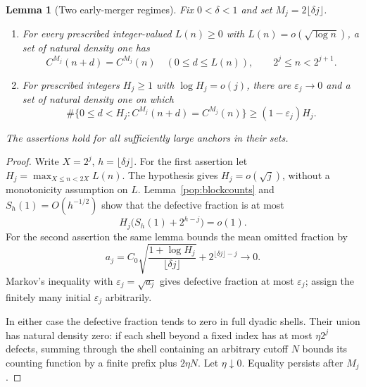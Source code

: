 \documentclass[11pt]{amsart}
\newtheorem{lemma}[theorem]{Lemma}
\theoremstyle{definition}
\theoremstyle{remark}
\begin{document}
\begin{lemma}[Two early-merger regimes]\label{lem:early}
Fix $0<\delta<1$ and set $M_j=2\lfloor\delta j\rfloor$.
\begin{enumerate}
\item For every prescribed integer-valued $L(n)\ge0$ with
$L(n)=o(\sqrt{\log n})$, a set of natural density one has
\[
 C^{M_j}(n+d)=C^{M_j}(n)\quad(0\le d\le L(n)),
 \qquad 2^j\le n<2^{j+1}.
\]
\item For prescribed integers $H_j\ge1$ with $\log H_j=o(j)$, there
are $\varepsilon_j\to0$ and a set of natural density one on which
\[
 \#\{0\le d<H_j:C^{M_j}(n+d)=C^{M_j}(n)\}
 \ge(1-\varepsilon_j)H_j.
\]
\end{enumerate}
The assertions hold for all sufficiently large anchors in their sets.
\end{lemma}
\begin{proof}
Write $X=2^j$, $h=\lfloor\delta j\rfloor$. For the first assertion let
$H_j=\max_{X\le n<2X}L(n)$. The hypothesis gives $H_j=o(\sqrt j)$,
without a monotonicity assumption on $L$. Lemma~\ref{pop:blockcounts}
and $S_h(1)=O(h^{-1/2})$ show that the defective fraction is at most
\[
 H_j\bigl(S_h(1)+2^{h-j}\bigr)=o(1).
\]
For the second assertion the same lemma bounds the mean omitted fraction by
\[
 a_j=C_0\sqrt{\frac{1+\log H_j}{\lfloor\delta j\rfloor}}
             +2^{\lfloor\delta j\rfloor-j}\longrightarrow0.
\]
Markov's inequality with $\varepsilon_j=\sqrt{a_j}$ gives defective
fraction at most $\varepsilon_j$; assign the finitely many initial
$\varepsilon_j$ arbitrarily.

In either case the defective fraction tends to zero in full dyadic shells.
Their union has natural density zero: if each shell beyond a fixed index
has at most $\eta2^j$ defects, summing through the shell containing an
arbitrary cutoff $N$ bounds its counting function by a finite prefix plus
$2\eta N$. Let $\eta\downarrow0$. Equality persists after $M_j$.
\end{proof}
\end{document}
